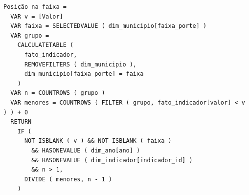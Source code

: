 \begin{verbatim}
Posição na faixa =
  VAR v = [Valor]
  VAR faixa = SELECTEDVALUE ( dim_municipio[faixa_porte] )
  VAR grupo =
    CALCULATETABLE (
      fato_indicador,
      REMOVEFILTERS ( dim_municipio ),
      dim_municipio[faixa_porte] = faixa
    )
  VAR n = COUNTROWS ( grupo )
  VAR menores = COUNTROWS ( FILTER ( grupo, fato_indicador[valor] < v ) ) + 0
  RETURN
    IF (
      NOT ISBLANK ( v ) && NOT ISBLANK ( faixa )
        && HASONEVALUE ( dim_ano[ano] )
        && HASONEVALUE ( dim_indicador[indicador_id] )
        && n > 1,
      DIVIDE ( menores, n - 1 )
    )
\end{verbatim}
